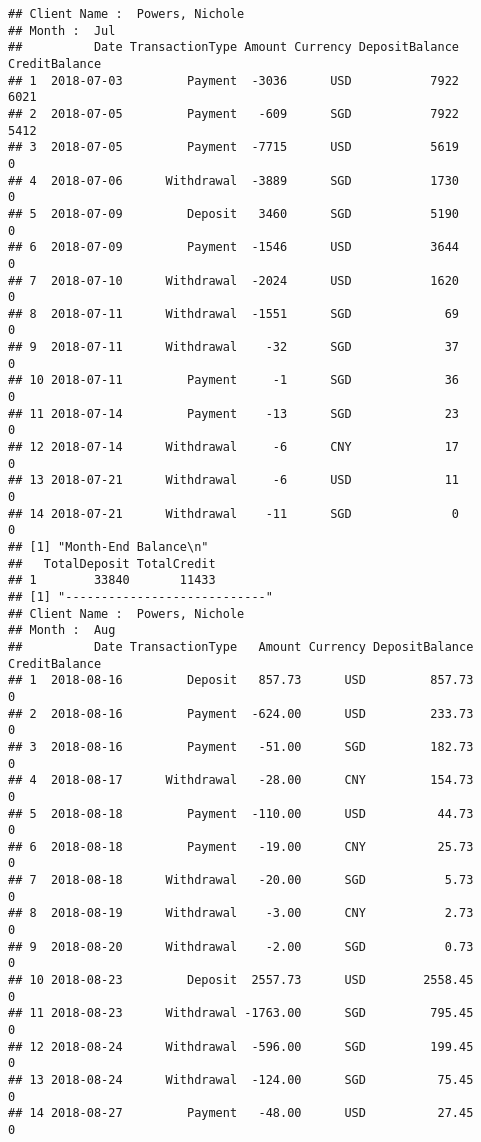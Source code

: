 \documentclass[]{article}
\begin{document}
\begin{verbatim}
## Client Name :  Powers, Nichole 
## Month :  Jul 
##          Date TransactionType Amount Currency DepositBalance CreditBalance
## 1  2018-07-03         Payment  -3036      USD           7922          6021
## 2  2018-07-05         Payment   -609      SGD           7922          5412
## 3  2018-07-05         Payment  -7715      USD           5619             0
## 4  2018-07-06      Withdrawal  -3889      SGD           1730             0
## 5  2018-07-09         Deposit   3460      SGD           5190             0
## 6  2018-07-09         Payment  -1546      USD           3644             0
## 7  2018-07-10      Withdrawal  -2024      USD           1620             0
## 8  2018-07-11      Withdrawal  -1551      SGD             69             0
## 9  2018-07-11      Withdrawal    -32      SGD             37             0
## 10 2018-07-11         Payment     -1      SGD             36             0
## 11 2018-07-14         Payment    -13      SGD             23             0
## 12 2018-07-14      Withdrawal     -6      CNY             17             0
## 13 2018-07-21      Withdrawal     -6      USD             11             0
## 14 2018-07-21      Withdrawal    -11      SGD              0             0
## [1] "Month-End Balance\n"
##   TotalDeposit TotalCredit
## 1        33840       11433
## [1] "----------------------------"
## Client Name :  Powers, Nichole 
## Month :  Aug 
##          Date TransactionType   Amount Currency DepositBalance CreditBalance
## 1  2018-08-16         Deposit   857.73      USD         857.73             0
## 2  2018-08-16         Payment  -624.00      USD         233.73             0
## 3  2018-08-16         Payment   -51.00      SGD         182.73             0
## 4  2018-08-17      Withdrawal   -28.00      CNY         154.73             0
## 5  2018-08-18         Payment  -110.00      USD          44.73             0
## 6  2018-08-18         Payment   -19.00      CNY          25.73             0
## 7  2018-08-18      Withdrawal   -20.00      SGD           5.73             0
## 8  2018-08-19      Withdrawal    -3.00      CNY           2.73             0
## 9  2018-08-20      Withdrawal    -2.00      SGD           0.73             0
## 10 2018-08-23         Deposit  2557.73      USD        2558.45             0
## 11 2018-08-23      Withdrawal -1763.00      SGD         795.45             0
## 12 2018-08-24      Withdrawal  -596.00      SGD         199.45             0
## 13 2018-08-24      Withdrawal  -124.00      SGD          75.45             0
## 14 2018-08-27         Payment   -48.00      USD          27.45             0

\end{verbatim}
\end{document}
